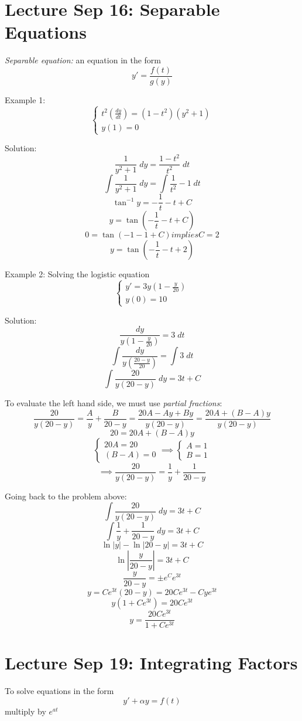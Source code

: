 \documentclass[12pt]{article}
\begin{document}
\section{Lecture Sep 16: Separable Equations}
\emph{Separable equation:} an equation in the form 
\[y' = \frac{f(t)}{g(y)}\]

Example 1:
\[\begin{cases}
    t^2 \left(\frac{dy}{dt}\right) = (1 -t^2)(y^2 + 1)\\
    y(1) = 0
\end{cases}\]

Solution:
\[\frac{1}{y^2 + 1} \; dy = \frac{1 - t^2}{t^2} \; dt\]
\[\int \frac{1}{y^2 + 1} \; dy = \int \frac{1}{t^2} - 1 \; dt\]
\[\tan^{-1} y = -\frac{1}{t} - t + C\]
\[y = \tan \left(-\frac{1}{t} - t + C\right)\]
\[0 = \tan (-1 - 1 + C) implies C = 2\]
\[\boxed{y = \tan \left(-\frac{1}{t} - t + 2\right)}\]

Example 2: Solving the logistic equation
\[\begin{cases}
    y' = 3y\left(1 - \frac{y}{20}\right)\\
    y(0) = 10
\end{cases}\]

Solution:
\[\frac{dy}{y (1 - \frac{y}{20})} = 3\; dt\]
\[\int \frac{dy}{y (\frac{20 - y}{20})} = \int 3 \; dt\]
\[\int \frac{20}{y(20 - y)}\; dy = 3t + C\]

To evaluate the left hand side, we must use \emph{partial fractions}:
\[\frac{20}{y(20 - y)} = \frac{A}{y} + \frac{B}{20 - y} = \frac{20A - Ay + By}{y(20 - y)} = \frac{20A + (B - A)y}{y(20 - y)}\]
\[20 = 20A + (B - A)y\]
\[\begin{cases}
    20A = 20\\
    (B - A) = 0
\end{cases} \implies \begin{cases}
    A = 1\\
    B = 1
\end{cases}\]
\[\implies \frac{20}{y (20 - y)} = \frac{1}{y} + \frac{1}{20 - y}\]

Going back to the problem above:
\[\int \frac{20}{y(20 - y)}\; dy = 3t + C\]
\[\int \frac{1}{y} + \frac{1}{20 - y}\; dy = 3t + C\]
\[\ln |y| - \ln |20 - y| = 3t + C\]
\[\ln \left|\frac{y}{20 - y}\right| = 3t + C\]
\[\frac{y}{20 - y} = \pm e^C e^{3t}\]
\[y = Ce^{3t} (20 - y) = 20Ce^{3t} - Cye^{3t}\]
\[y(1 + Ce^{3t}) = 20Ce^{3t}\]
\[\boxed{y = \frac{20Ce^{3t}}{1 + Ce^{3t}}}\]

\section{Lecture Sep 19: Integrating Factors}
To solve equations in the form
\[y' + \alpha y = f(t)\]
multiply by $e^{at}$
\end{document}
